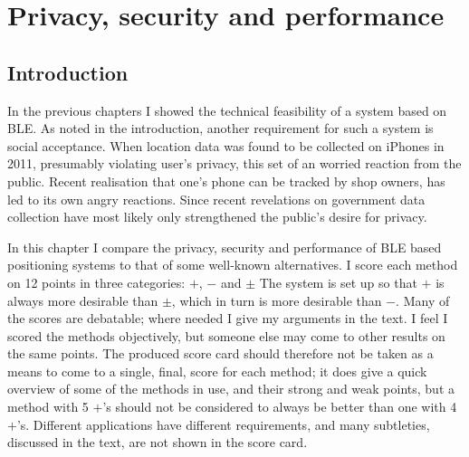 \chapter{Privacy, security and performance}
\label{chap:security}

\newcommand{\yes}{\(+\)\xspace}
\newcommand{\no}{\(-\)\xspace}
\newcommand{\maybe}{\(\pm\)\xspace}
\newcommand{\cat}[1]{\begin{em}#1\end{em}}

\section{Introduction}
In the previous chapters I showed the technical feasibility of a \ptfp system based on BLE.
As noted in the introduction, another requirement for such a system is social acceptance.
When location data was found to be collected on iPhones in 2011, presumably violating user's privacy, this set of an worried reaction from the public.
Recent realisation that one's phone can be tracked by shop owners, has led to its own angry reactions.
Since recent revelations on government data collection have most likely only strengthened the public's desire for privacy.

In this chapter I compare the privacy, security and performance of BLE based positioning systems to that of some well-known alternatives.
I score each method on 12 points in three categories: \yes, \no and \maybe
The system is set up so that \yes is always more desirable than \maybe, which in turn is more desirable than \no.
Many of the scores are debatable; where needed I give my arguments in the text.
I feel I scored the methods objectively, but someone else may come to other results on the same points.
The produced score card should therefore not be taken as a means to come to a single, final, score for each method; it does give a quick overview of some of the methods in use, and their strong and weak points, but a method with 5 \yes's should not be considered to always be better than one with 4 \yes's.
Different applications have different requirements, and many subtleties, discussed in the text, are not shown in the score card.

